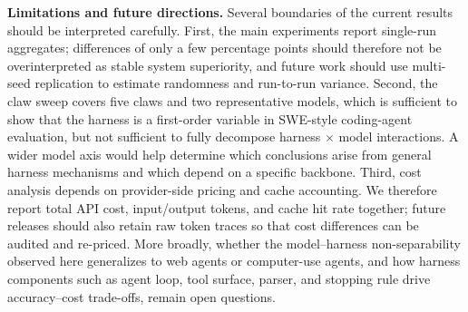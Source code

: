 \documentclass{llmxive}
\begin{document}
\textbf{Limitations and future directions.}
Several boundaries of the current results should be interpreted carefully. First, the main experiments report single-run aggregates; differences of only a few percentage points should therefore not be overinterpreted as stable system superiority, and future work should use multi-seed replication to estimate randomness and run-to-run variance. Second, the claw sweep covers five claws and two representative models, which is sufficient to show that the harness is a first-order variable in SWE-style coding-agent evaluation, but not sufficient to fully decompose harness $\times$ model interactions. A wider model axis would help determine which conclusions arise from general harness mechanisms and which depend on a specific backbone. Third, cost analysis depends on provider-side pricing and cache accounting. We therefore report total API cost, input/output tokens, and cache hit rate together; future releases should also retain raw token traces so that cost differences can be audited and re-priced. More broadly, whether the model--harness non-separability observed here generalizes to web agents or computer-use agents, and how harness components such as agent loop, tool surface, parser, and stopping rule drive accuracy--cost trade-offs, remain open questions.







\appendix

\end{document}
